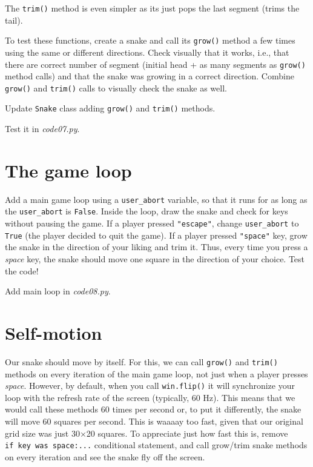\documentclass[
]{book}
\begin{document}
The \texttt{trim()} method is even simpler as its just pops the last segment (trims the tail).

To test these functions, create a snake and call its \texttt{grow()} method a few times using the same or different directions. Check visually that it works, i.e., that there are correct number of segment (initial head + as many segments as \texttt{grow()} method calls) and that the snake was growing in a correct direction. Combine \texttt{grow()} and \texttt{trim()} calls to visually check the snake as well.

Update \texttt{Snake} class adding \texttt{grow()} and \texttt{trim()} methods.

Test it in \emph{code07.py}.

\hypertarget{the-game-loop}{%
\section{The game loop}\label{the-game-loop}}

Add a main game loop using a \texttt{user\_abort} variable, so that it runs for as long as the \texttt{user\_abort} is \texttt{False}. Inside the loop, draw the snake and check for keys without pausing the game. If a player pressed \texttt{"escape"}, change \texttt{user\_abort} to \texttt{True} (the player decided to quit the game). If a player pressed \texttt{"space"} key, grow the snake in the direction of your liking and trim it. Thus, every time you press a \emph{space} key, the snake should move one square in the direction of your choice. Test the code!

Add main loop in \emph{code08.py}.

\hypertarget{self-motion}{%
\section{Self-motion}\label{self-motion}}

Our snake should move by itself. For this, we can call \texttt{grow()} and \texttt{trim()} methods on every iteration of the main game loop, not just when a player presses \emph{space}. However, by default, when you call \texttt{win.flip()} it will synchronize your loop with the refresh rate of the screen (typically, 60 Hz). This means that we would call these methods 60 times per second or, to put it differently, the snake will move 60 squares per second. This is waaaay too fast, given that our original grid size was just 30×20 squares. To appreciate just how fast this is, remove \texttt{if\ key\ was\ space:...} conditional statement, and call grow/trim snake methods on every iteration and see the snake fly off the screen.
\end{document}
